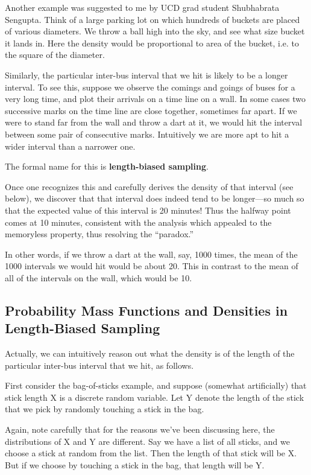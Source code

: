 Another example was suggested to me by UCD grad student Shubhabrata
Sengupta.  Think of a large parking lot on which hundreds of buckets are
placed of various diameters.  We throw a ball high into the sky, and see
what size bucket it lands in.  Here the density would be proportional to
area of the bucket, i.e. to the square of the diameter. 

Similarly, the particular inter-bus interval that we hit is likely to be
a longer interval.  To see this, suppose we observe the comings and
goings of buses for a very long time, and plot their arrivals on a time
line on a wall.  In some cases two successive marks on the time line are
close together, sometimes far apart.  If we were to stand far from the
wall and throw a dart at it, we would hit the interval between some pair of
consecutive marks.  Intuitively we are more apt to hit a wider interval
than a narrower one.

The formal name for this is \textbf{length-biased sampling}.

Once one recognizes this and carefully derives the density of that
interval (see below), we discover that that interval does indeed tend to
be longer---so much so that the expected value of this interval is 20
minutes!  Thus the halfway point comes at 10 minutes, consistent with
the analysis which appealed to the memoryless property, thus resolving
the ``paradox.''

In other words, if we throw a dart at the wall, say, 1000
times, the mean of the 1000 intervals we would hit would be about 20.
This in contrast to the mean of all of the intervals on the wall, which
would be 10.

\subsection{Probability Mass Functions and Densities in Length-Biased
Sampling}

Actually, we can intuitively reason out what the density is of the
length of the particular inter-bus interval that we hit, as follows.

First consider the bag-of-sticks example, and suppose (somewhat
artificially) that stick length X is a discrete random variable.  Let Y
denote the length of the stick that we pick by randomly touching a stick
in the bag.  

Again, note carefully that for the reasons we've been discussing here,
the distributions of X and Y are different.  Say we have a list of all
sticks, and we choose a stick at random from the list.  Then the length
of that stick will be X.  But if we choose by touching a stick in the
bag, that length will be Y.

